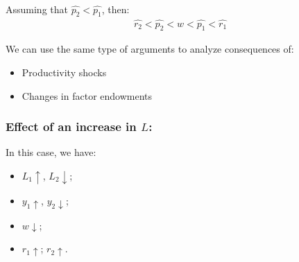 \begin{theorem}
    \

    Assuming that $\hat{p_2} < \hat{p_1}$, then:
    \begin{gather*}
        \hat{r_2} < \hat{p_2} < \hat{w} < \hat{p_1} < \hat{r_1}
    \end{gather*}
\end{theorem}

We can use the same type of arguments to analyze consequences of:
\begin{itemize}
    \item Productivity shocks
    \item Changes in factor endowments
\end{itemize}

\subsubsection{Effect of an increase in $L$:}
In this case, we have:
\begin{itemize}
    \item $L_1 \uparrow$, $L_2 \downarrow$;
    \item $y_1 \uparrow$, $y_2 \downarrow$;
    \item $w \downarrow$;
    \item $r_1 \uparrow$; $r_2 \uparrow$.
\end{itemize}


